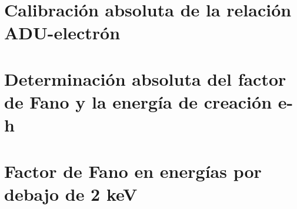 \documentclass[a4paper,12pt]{report}
\begin{document}
\singlespace
\chapter{Calibración absoluta de la relación ADU-electrón} \label{cap: calibracion}

\singlespace
\chapter{Determinación absoluta del factor de Fano y la energía de creación e-h}
\label{cap:fano}

\singlespace
\chapter{Factor de Fano en energías por debajo de 2 keV} \label{cap:bajaenergia}


\end{document}
